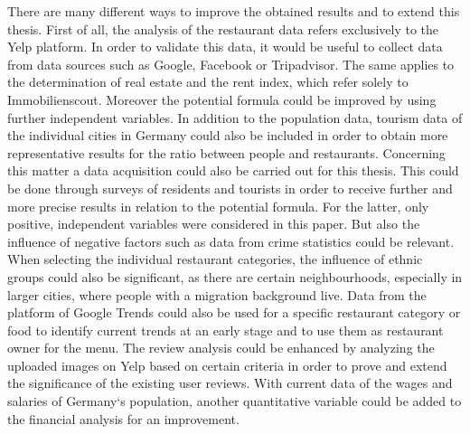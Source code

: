 %
%
There are many different ways to improve the obtained results and to extend this thesis. First of all, the analysis of the restaurant data refers exclusively to the Yelp platform. In order to validate this data, it would be useful to collect data from data sources such as Google, Facebook or Tripadvisor. The same applies to the determination of real estate and the rent index, which refer solely to Immobilienscout. \newline
Moreover the potential formula could be improved by using further independent variables. In addition to the population data, tourism data of the individual cities in Germany could also be included in order to obtain more representative results for the ratio between people and restaurants. Concerning this matter a data acquisition could also be carried out for this thesis. This could be done through surveys of residents and tourists in order to receive further and more precise results in relation to the potential formula. For the latter, only positive, independent variables were considered in this paper. But also the influence of negative factors such as data from crime statistics could be relevant. \newline
When selecting the individual restaurant categories, the influence of ethnic groups could also be significant, as there are certain neighbourhoods, especially in larger cities, where people with a migration background live. Data from the platform of Google Trends could also be used for a specific restaurant category or food to identify current trends at an early stage and to use them as restaurant owner for the menu. \newline
The review analysis could be enhanced by analyzing the uploaded images on Yelp based on certain criteria in order to prove and extend the significance of the existing user reviews. \newline
With current data of the wages and salaries of Germany‘s population, another quantitative variable could be added to the financial analysis for an improvement. 